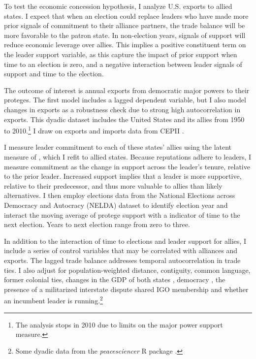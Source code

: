 \documentclass[12pt]{article}
\begin{document}
To test the economic concession hypothesis, I analyze U.S. exports to allied states. 
I expect that when an election could replace leaders who have made more prior signals of commitment to their alliance partners, the trade balance will be more favorable to the patron state.
In non-election years, signals of support will reduce economic leverage over allies.
This implies a positive constituent term on the leader support variable, as this capture the impact of prior support when time to an election is zero, and a negative interaction between leader signals of support and time to the election.


The outcome of interest is annual exports from democratic major powers to their proteges. 
The first model includes a lagged dependent variable, but I also model changes in exports as a robustness check due to strong high autocorrelation in exports.
This dyadic dataset includes the United States and its allies from 1950 to 2010.\footnote{The analysis stops in 2010 due to limits on the major power support measure.}
I draw on exports and imports data from CEPII \citep{FouquinHugot2016}.


I measure leader commitment to each of these states' allies using the latent measure of \citet{McManusNieman2019}, which I refit to allied states. 
Because reputations adhere to leaders, I measure commitment as the change in support across the leader's tenure, relative to the prior leader. 
Increased support implies that a leader is more supportive, relative to their predecessor, and thus more valuable to allies than likely alternatives.
I then employ elections data from the National Elections across Democracy and Autocracy (NELDA) dataset \citep{HydeMarinov2012} to identify election year and interact the moving average of protege support with a indicator of time to the next election.
Years to next election range from zero to three. 


In addition to the interaction of time to elections and leader support for allies, I include a series of control variables that may be correlated with alliances and exports. 
The lagged trade balance addresses temporal autocorrelation in trade ties.
I also adjust for population-weighted distance, contiguity, common language, former colonial ties, changes in the GDP of both states \citep{FouquinHugot2016}, democracy \citep{Marquez2016}, the presence of a militarized interstate dispute \citep{Gibleretal2016} shared IGO membership \citep{Pevehouseetal2020} and whether an incumbent leader is running.\footnote{Some dyadic data from the \textit{peacesciencer} \textsf{R} package \citep{peacesciencer-package}.}
\end{document}
